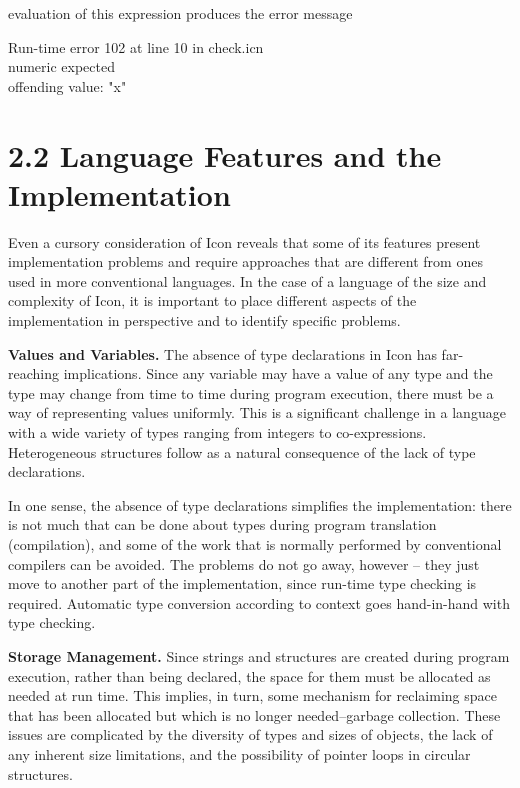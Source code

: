 
\noindent
evaluation of this expression produces the error message

\begin{iconcode}
\>Run-time error 102 at line 10 in check.icn\\
\>numeric expected\\
\>offending value: "x"
\end{iconcode}

\section[2.2 Language Features and the Implementation]{2.2 Language Features and the Implementation}

Even a cursory consideration of Icon reveals that some of its features
present implementation problems and require approaches that are
different from ones used in more conventional languages. In the case
of a language of the size and complexity of Icon, it is important to
place different aspects of the implementation in perspective and to
identify specific problems.


\textbf{Values and Variables.} The absence of type declarations in
Icon has far-reaching implications. Since any variable may have a
value of any type and the type may change from time to time during
program execution, there must be a way of representing values
uniformly. This is a significant challenge in a language with a wide
variety of types ranging from integers to
co-expressions. Heterogeneous structures follow as a natural
consequence of the lack of type declarations.

In one sense, the absence of type declarations simplifies the
implementation: there is not much that can be done about types during
program translation (compilation), and some of the work that is
normally performed by conventional compilers can be avoided. The
problems do not go away, however -- they just move to another part of
the implementation, since run-time type checking is
required. Automatic type conversion according to context goes
hand-in-hand with type checking.


\textbf{Storage Management.} Since strings and structures are created
during program execution, rather than being declared, the space for
them must be allocated as needed at run time. This implies, in turn,
some mechanism for reclaiming space that has been allocated but which
is no longer needed--{\textquotedbl}garbage collection.{\textquotedbl}
These issues are complicated by the diversity of types and sizes of
objects, the lack of any inherent size limitations, and the
possibility of pointer loops in circular structures.


